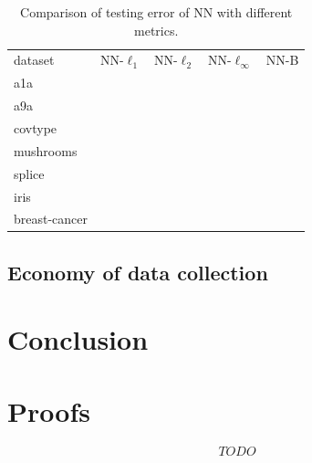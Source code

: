 \documentclass{article}
\begin{document}
\begin{table}
\caption{Comparison of testing error of NN with different metrics.}
\label{tbl:BD-NN}
\begin{tabular}{l|r|r|r|r}
dataset & NN-$\ell_1$ 
		& NN-$\ell_2$
		& NN-$\ell_\infty$
        & NN-B
\\        
a1a
\\
a9a
\\
covtype
\\
mushrooms
\\
splice
\\
iris
\\
breast-cancer
\end{tabular}



\end{table}











\subsection{Economy of data collection}


\clearpage 
\section{Conclusion} 
 
 







\clearpage 
\appendix

\onecolumn 
\section{Proofs}

$$ TODO $$
\end{document}
